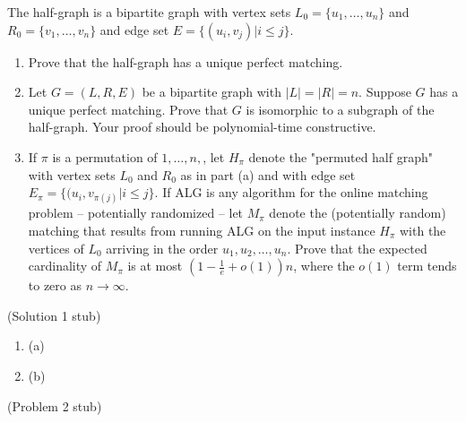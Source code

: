 \documentclass{hmcpset}
\begin{document}
\begin{problem}[1]
The half-graph is a bipartite graph with vertex sets $L_0 = \{u_1,\ldots,u_n\}$ and $R_0 = \{v_1,\ldots,v_n\}$ and edge set $E = \{(u_i, v_j) | i \leq j\}$.
\begin{enumerate}
\item Prove that the half-graph has a unique perfect matching.
\item Let $G = (L,R,E)$ be a bipartite graph with $|L| = |R| = n$. Suppose $G$ has a unique perfect matching. Prove that $G$ is isomorphic to a subgraph of the half-graph. Your proof should be polynomial-time constructive.
\item If $\pi$ is a permutation of ${1,\ldots,n},$, let $H_\pi$ denote the "permuted half graph" with vertex sets $L_0$ and $R_0$ as in part (a) and with edge set $E_\pi = \{(u_i, v_{\pi(j)} | i \leq j\}$. If ALG is any algorithm for the online matching problem -- potentially randomized -- let $M_\pi$ denote the (potentially random) matching that results from running ALG on the input instance $H_\pi$ with the vertices of $L_0$ arriving in the order $u_1, u_2, \ldots, u_n$. Prove that the expected cardinality of $M_\pi$ is at most $(1-\frac{1}{e} + o(1))n$, where the $o(1)$ term tends to zero as $n\rightarrow \infty$.
\end{enumerate}
\end{problem}
\begin{solution}
(Solution 1 stub)
\begin{enumerate}
\item (a)
\item (b)
\end{enumerate}
\end{solution}
\begin{problem}[2]
(Problem 2 stub)
\end{problem}
\end{document}
